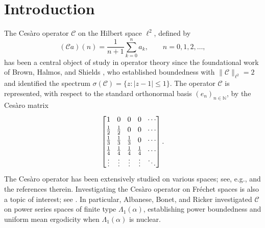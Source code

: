 \documentclass{birkjour}
\theoremstyle{definition}
\theoremstyle{remark}
\numberwithin{equation}{section}
\begin{document}
\section{Introduction}
The Ces\`{a}ro operator $\mathcal{C}$ on the Hilbert space $\ell^2$, 
defined by
$$(\mathcal{C}a)(n)=\frac{1}{n+1}\sum^{n}_{k=0}a_k, \qquad n=0,1,2,\ldots,$$
has been a central object of study in operator theory since the foundational 
work of Brown, Halmos, and Shields \cite{BHS}, who established boundedness 
with $\|\mathcal{C}\|_{\ell^2}=2$ and identified the spectrum 
$\sigma(\mathcal{C})=\{z:|z-1|\leq 1\}$. 
The operator $\mathcal{C}$ is represented, with respect to the standard 
orthonormal basis $(e_n)_{n\in\mathbb{N}}$, by the Ces\`{a}ro matrix 
\begin{equation}
\displaystyle \renewcommand{\arraystretch}{1.2} 
\setlength{\arraycolsep}{4pt}
\begin{bmatrix}
1 &0&0&0&\cdots \\
\frac{1}{2}&\frac{1}{2}&0&0&\cdots\\
\frac{1}{3}&\frac{1}{3}&\frac{1}{3}&0&\cdots\\
\frac{1}{4}&\frac{1}{4}&\frac{1}{4}&\frac{1}{4}&\cdots\\
\vdots&\vdots&\vdots&\vdots&\ddots
\end{bmatrix} 
\renewcommand{\arraystretch}{1.0}
\setlength{\arraycolsep}{4pt}.
\end{equation} The Ces\`{a}ro operator has been extensively studied on various spaces; 
see, e.g., \cite{ABR5,ABR4,ABR8,BURS,BHS,GP,Ross} and the references therein. Investigating the Ces\`{a}ro operator on Fr\'echet spaces is also a topic of interest; see \cite{ABR6, ABR7, E1, E2, E3}. In particular, Albanese, Bonet, 
and Ricker \cite{ABR7} investigated $\mathcal{C}$ on power series spaces 
of finite type $\Lambda_{1}(\alpha)$, establishing power boundedness and 
uniform mean ergodicity when $\Lambda_{1}(\alpha)$ is nuclear.
\end{document}
